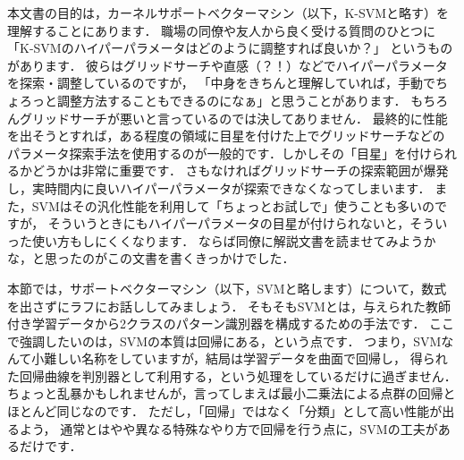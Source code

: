 %

本文書の目的は，カーネルサポートベクターマシン（以下，K-SVMと略す）を理解することにあります．
職場の同僚や友人から良く受ける質問のひとつに「K-SVMのハイパーパラメータはどのように調整すれば良いか？」
というものがあります．
彼らはグリッドサーチや直感（？！）などでハイパーパラメータを探索・調整しているのですが，
「中身をきちんと理解していれば，手動でちょろっと調整方法することもできるのになぁ」と思うことがあります．
もちろんグリッドサーチが悪いと言っているのでは決してありません．
最終的に性能を出そうとすれば，ある程度の領域に目星を付けた上でグリッドサーチなどの
パラメータ探索手法を使用するのが一般的です．しかしその「目星」を付けられるかどうかは非常に重要です．
さもなければグリッドサーチの探索範囲が爆発し，実時間内に良いハイパーパラメータが探索できなくなってしまいます．
また，SVMはその汎化性能を利用して「ちょっとお試しで」使うことも多いのですが，
そういうときにもハイパーパラメータの目星が付けられないと，そういった使い方もしにくくなります．
ならば同僚に解説文書を読ませてみようかな，と思ったのがこの文書を書くきっかけでした．

本節では，サポートベクターマシン（以下，SVMと略します）について，数式を出さずにラフにお話ししてみましょう．
そもそもSVMとは，与えられた教師付き学習データから2クラスのパターン識別器を構成するための手法です．
ここで強調したいのは，SVMの本質は回帰にある，という点です．
つまり，SVMなんて小難しい名称をしていますが，結局は学習データを曲面で回帰し，
得られた回帰曲線を判別器として利用する，という処理をしているだけに過ぎません．
ちょっと乱暴かもしれませんが，言ってしまえば最小二乗法による点群の回帰とほとんど同じなのです．
ただし，「回帰」ではなく「分類」として高い性能が出るよう，
通常とはやや異なる特殊なやり方で回帰を行う点に，SVMの工夫があるだけです．

